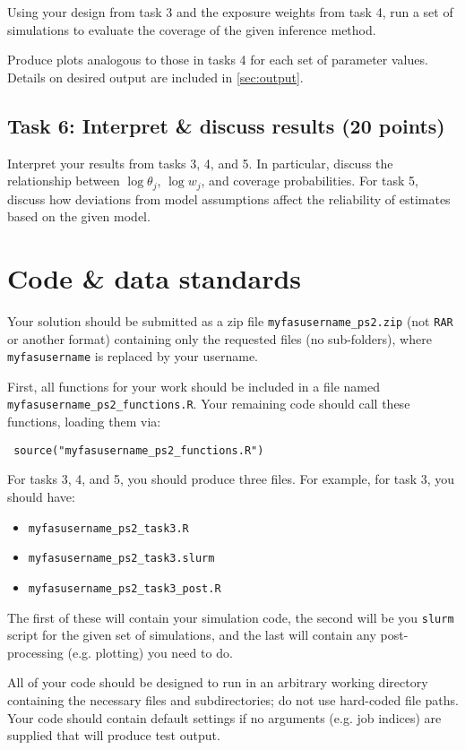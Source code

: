 \documentclass[11pt]{article}
\begin{document}
Using your design from task 3 and the exposure weights from task 4, run a set of simulations to evaluate the coverage of the given inference method.

Produce plots analogous to those in tasks 4 for each set of parameter values. Details on desired output are included in \autoref{sec:output}.

\subsection{Task 6: Interpret \& discuss results (20 points)}

Interpret your results from tasks 3, 4, and 5. In particular, discuss the relationship between $\log \theta_j$, $\log w_j$, and coverage probabilities. For task 5, discuss how deviations from model assumptions affect the reliability of estimates based on the given model.

\section{Code \& data standards}
\label{sec:code}

Your solution should be submitted as a zip file \verb+myfasusername_ps2.zip+ (not \verb+RAR+ or another format) containing only the requested files (no sub-folders), where \verb+myfasusername+ is replaced by your username.

First, all functions for your work should be included in a file named \verb+myfasusername_ps2_functions.R+. Your remaining code should call these functions, loading them via:

\begin{verbatim}
 source("myfasusername_ps2_functions.R")
\end{verbatim}

For tasks 3, 4, and 5, you should produce three files. For example, for task 3, you should have:
\begin{itemize}
 \item \verb+myfasusername_ps2_task3.R+
 \item \verb+myfasusername_ps2_task3.slurm+
 \item \verb+myfasusername_ps2_task3_post.R+
\end{itemize}
The first of these will contain your simulation code, the second will be you \verb+slurm+ script for the given set of simulations, and the last will contain any post-processing (e.g. plotting) you need to do.

All of your code should be designed to run in an arbitrary working directory containing the necessary files and subdirectories; do not use hard-coded file paths. Your code should contain default settings if no arguments (e.g. job indices) are supplied that will produce test output.
\end{document}
